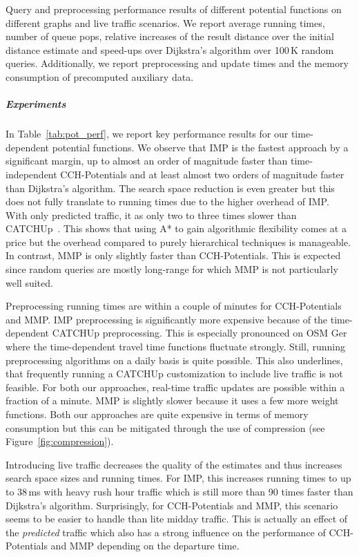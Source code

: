\documentclass[a4paper,UKenglish,cleveref, autoref, thm-restate,anonymous]{lipics-v2021}
\begin{document}
\begin{table}
\centering
\caption{
Query and preprocessing performance results of different potential functions on different graphs and live traffic scenarios.
We report average running times, number of queue pops, relative increases of the result distance over the initial distance estimate and speed-ups over Dijkstra's algorithm over 100\,K random queries.
Additionally, we report preprocessing and update times and the memory consumption of precomputed auxiliary data.
}\label{tab:pot_perf}

\end{table}

\subparagraph{Experiments} In Table~\ref{tab:pot_perf}, we report key performance results for our time-dependent potential functions.
We observe that IMP is the fastest approach by a significant margin, up to almost an order of magnitude faster than time-independent CCH-Potentials and at least almost two orders of magnitude faster than Dijkstra's algorithm.
The search space reduction is even greater but this does not fully translate to running times due to the higher overhead of IMP.
With only predicted traffic, it as only two to three times slower than CATCHUp~\cite{swz-sfert-21}.
This shows that using A* to gain algorithmic flexibility comes at a price but the overhead compared to purely hierarchical techniques is manageable.
In contrast, MMP is only slightly faster than CCH-Potentials.
This is expected since random queries are mostly long-range for which MMP is not particularly well suited.

Preprocessing running times are within a couple of minutes for CCH-Potentials and MMP.
IMP preprocessing is significantly more expensive because of the time-dependent CATCHUp preprocessing.
This is especially pronounced on OSM Ger where the time-dependent travel time functions fluctuate strongly.
Still, running preprocessing algorithms on a daily basis is quite possible.
This also underlines, that frequently running a CATCHUp customization to include live traffic is not feasible.
For both our approaches, real-time traffic updates are possible within a fraction of a minute.
MMP is slightly slower because it uses a few more weight functions.
Both our approaches are quite expensive in terms of memory consumption but this can be mitigated through the use of compression (see Figure~\ref{fig:compression}).

Introducing live traffic decreases the quality of the estimates and thus increases search space sizes and running times.
For IMP, this increases running times to up to 38\,ms with heavy rush hour traffic which is still more than 90 times faster than Dijkstra's algorithm.
Surprisingly, for CCH-Potentials and MMP, this scenario seems to be easier to handle than lite midday traffic.
This is actually an effect of the \emph{predicted} traffic which also has a strong influence on the performance of CCH-Potentials and MMP depending on the departure time.
\end{document}
